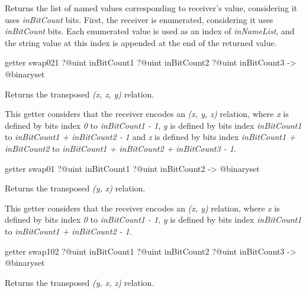 Returns the list of named values corresponding to receiver's value, considering it uses \emph{inBitCount} bits. First, the receiver is enumerated, considering it uses \emph{inBitCount} bits. Each enumerated value is used as an index of \emph{inNameList}, and the string value at this index is appended at the end of the returned value.








\begin{galgasbox}
getter swap021
  ?@uint inBitCount1
  ?@uint inBitCount2
  ?@uint inBitCount3
  -> @binaryset
\end{galgasbox}



Returns the transposed \emph{(x, z, y)} relation.

This getter considers that the receiver encodes an \emph{(x, y, z)} relation, where \emph{x} is defined by bits index \emph{0} to \emph{inBitCount1  - 1}, \emph{y} is defined by bits index \emph{inBitCount1} to \emph{inBitCount1 + inBitCount2 - 1} and  \emph{z} is defined by bits index \emph{inBitCount1 + inBitCount2} to \emph{inBitCount1 + inBitCount2 + inBitCount3 - 1}.








\begin{galgasbox}
getter swap01 ?@uint inBitCount1 ?@uint inBitCount2 -> @binaryset
\end{galgasbox}


Returns the transposed \emph{(y, x)} relation.

This getter considers that the receiver encodes an \emph{(x, y)} relation, where \emph{x} is defined by bits index \emph{0} to \emph{inBitCount1  - 1}, \emph{y} is defined by bits index \emph{inBitCount1} to \emph{inBitCount1 + inBitCount2 - 1}.






\begin{galgasbox}
getter swap102
  ?@uint inBitCount1
  ?@uint inBitCount2
  ?@uint inBitCount3
  -> @binaryset
\end{galgasbox}

Returns the transposed \emph{(y, x, z)} relation.

